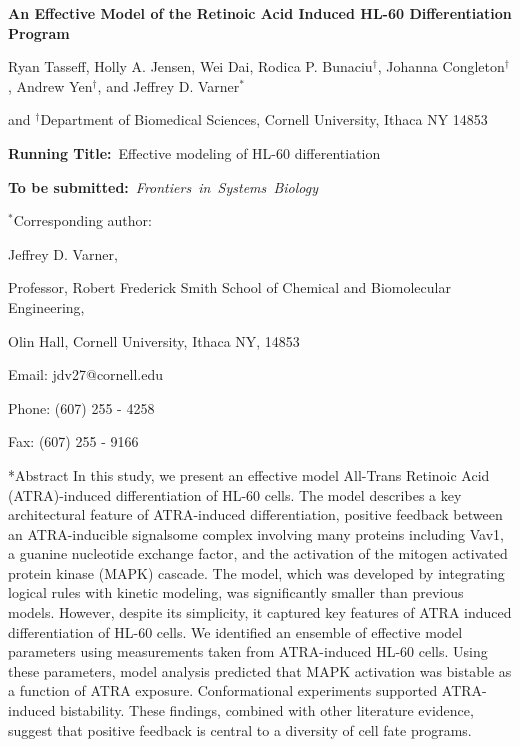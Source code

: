 \documentclass[12pt]{article}
\makeatletter
\renewcommand\section{\@startsection
	{subsection}{2}{0mm}
	{-0.2in}
	{0.05\baselineskip}
	{\normalfont\large\bfseries}}
\makeatother
\begin{document}
\begin{titlepage}
{\par\centering\textbf{\Large {An Effective Model of the Retinoic Acid Induced HL-60 Differentiation Program}}}
\vspace{0.05in}
{\par \centering \large{Ryan Tasseff, Holly A. Jensen, Wei Dai, Rodica P. Bunaciu$^{\dag}$, Johanna Congleton$^{\dag}$, Andrew Yen$^{\dag}$, and Jeffrey D. Varner$^{*}$}}
\vspace{0.10in}
{\par {} and {$^{\dag}$Department of Biomedical Sciences, {Cornell University, Ithaca NY 14853}}}
\vspace{0.1in}
{\par \centering \textbf{Running Title:}~Effective modeling of HL-60 differentiation}
\vspace{0.1in}
{\par \centering \textbf{To be submitted:}~\emph{Frontiers~in~Systems~Biology}}
\vspace{0.5in}
{\par \centering $^{*}$Corresponding author:}
{\par \centering Jeffrey D. Varner,}
{\par \centering Professor, Robert Frederick Smith School of Chemical and Biomolecular Engineering,}
{\par {} Olin Hall, Cornell University, Ithaca NY, 14853}
{\par \centering Email: jdv27@cornell.edu}
{\par \centering Phone: (607) 255 - 4258}
{\par \centering Fax: (607) 255 - 9166}
\end{titlepage}
\date{}
\thispagestyle{empty}
\pagebreak

\section*{Abstract}
In this study, we present an effective model All-Trans Retinoic Acid (ATRA)-induced differentiation of HL-60 cells.
The model describes a key architectural feature of ATRA-induced differentiation,
positive feedback between an ATRA-inducible signalsome complex involving many proteins including Vav1, a guanine nucleotide exchange factor,
and the activation of the mitogen activated protein kinase (MAPK) cascade.
The model, which was developed by integrating logical rules with kinetic modeling, was significantly smaller than previous models.
However, despite its simplicity, it captured key features of ATRA induced differentiation of HL-60 cells.
We identified an ensemble of effective model parameters using measurements taken from ATRA-induced HL-60 cells.
Using these parameters, model analysis predicted that MAPK activation was bistable as a function of ATRA exposure.
Conformational experiments supported ATRA-induced bistability.
These findings, combined with other literature evidence, suggest that positive feedback is central to a diversity of cell fate programs.
\end{document}
